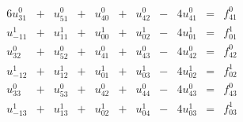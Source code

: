 \begin{alignat*}{6}
u_{31}^0 & {}+{} & u_{51}^0 & {}+{} & u_{40}^0 & {}+{} &  u_{42}^0 & {}-{} &  4u_{41}^0 & {}={} & f_{41}^0 \\
u_{-11}^1 & {}+{} & u_{11}^1 & {}+{} & u_{00}^1 & {}+{} &  u_{02}^1 & {}-{} &  4u_{01}^1 & {}={} & f_{01}^1\\
u_{32}^0 & {}+{} & u_{52}^0 & {}+{} & u_{41}^0 & {}+{} &  u_{43}^0 & {}-{} &  4u_{42}^0 & {}={} & f_{42}^0 \\
u_{-12}^1 & {}+{} & u_{12}^1 & {}+{} & u_{01}^1 & {}+{} &  u_{03}^1 & {}-{} &  4u_{02}^1 & {}={} & f_{02}^1\\
u_{33}^0 & {}+{} & u_{53}^0 & {}+{} & u_{42}^0 & {}+{} &  u_{44}^0 & {}-{} &  4u_{43}^0 & {}={} & f_{43}^0 \\
u_{-13}^1 & {}+{} & u_{13}^1 & {}+{} & u_{02}^1 & {}+{} &  u_{04}^1 & {}-{} &  4u_{03}^1 & {}={} & f_{03}^1
\end{alignat*}